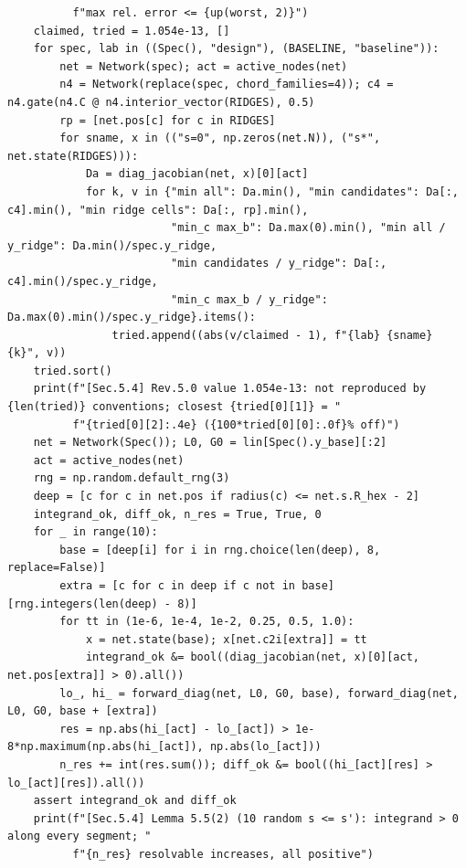 \documentclass[11pt,a4paper]{article}
\theoremstyle{definition}
\theoremstyle{remark}
\begin{document}
\begin{lstlisting}
          f"max rel. error <= {up(worst, 2)}")
    claimed, tried = 1.054e-13, []
    for spec, lab in ((Spec(), "design"), (BASELINE, "baseline")):
        net = Network(spec); act = active_nodes(net)
        n4 = Network(replace(spec, chord_families=4)); c4 = n4.gate(n4.C @ n4.interior_vector(RIDGES), 0.5)
        rp = [net.pos[c] for c in RIDGES]
        for sname, x in (("s=0", np.zeros(net.N)), ("s*", net.state(RIDGES))):
            Da = diag_jacobian(net, x)[0][act]
            for k, v in {"min all": Da.min(), "min candidates": Da[:, c4].min(), "min ridge cells": Da[:, rp].min(),
                         "min_c max_b": Da.max(0).min(), "min all / y_ridge": Da.min()/spec.y_ridge,
                         "min candidates / y_ridge": Da[:, c4].min()/spec.y_ridge,
                         "min_c max_b / y_ridge": Da.max(0).min()/spec.y_ridge}.items():
                tried.append((abs(v/claimed - 1), f"{lab} {sname} {k}", v))
    tried.sort()
    print(f"[Sec.5.4] Rev.5.0 value 1.054e-13: not reproduced by {len(tried)} conventions; closest {tried[0][1]} = "
          f"{tried[0][2]:.4e} ({100*tried[0][0]:.0f}% off)")
    net = Network(Spec()); L0, G0 = lin[Spec().y_base][:2]
    act = active_nodes(net)
    rng = np.random.default_rng(3)
    deep = [c for c in net.pos if radius(c) <= net.s.R_hex - 2]
    integrand_ok, diff_ok, n_res = True, True, 0
    for _ in range(10):
        base = [deep[i] for i in rng.choice(len(deep), 8, replace=False)]
        extra = [c for c in deep if c not in base][rng.integers(len(deep) - 8)]
        for tt in (1e-6, 1e-4, 1e-2, 0.25, 0.5, 1.0):
            x = net.state(base); x[net.c2i[extra]] = tt
            integrand_ok &= bool((diag_jacobian(net, x)[0][act, net.pos[extra]] > 0).all())
        lo_, hi_ = forward_diag(net, L0, G0, base), forward_diag(net, L0, G0, base + [extra])
        res = np.abs(hi_[act] - lo_[act]) > 1e-8*np.maximum(np.abs(hi_[act]), np.abs(lo_[act]))
        n_res += int(res.sum()); diff_ok &= bool((hi_[act][res] > lo_[act][res]).all())
    assert integrand_ok and diff_ok
    print(f"[Sec.5.4] Lemma 5.5(2) (10 random s <= s'): integrand > 0 along every segment; "
          f"{n_res} resolvable increases, all positive")



\end{lstlisting}
\end{document}
